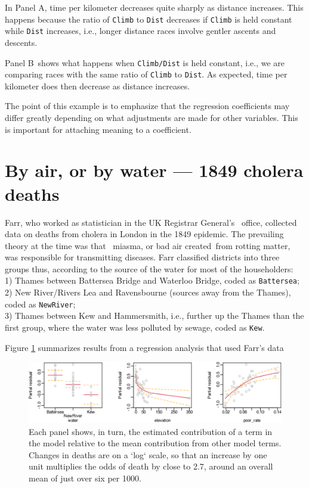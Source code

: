 \documentclass[
  10pt,
  b5paper]{book}
\begin{document}
In Panel A, time per kilometer decreases quite sharply as distance
increases. This happens because the ratio of \texttt{Climb} to \texttt{Dist}
decreases if \texttt{Climb} is held constant while \texttt{Dist} increases,
i.e., longer distance races involve gentler ascents and descents.

Panel B~shows what happens when \texttt{Climb/Dist} is held
constant, i.e., we are comparing races with the same ratio of
\texttt{Climb} to \texttt{Dist}. As expected, time per kilometer does then
decrease as distance increases.

The point of this example is to emphasize that the regression
coefficients may differ greatly depending on what adjustments
are made for other variables. This is important for attaching
meaning to a coefficient.

\hypertarget{by-air-or-by-water-1849-cholera-deaths}{%
\section{By air, or by water --- 1849 cholera deaths}\label{by-air-or-by-water-1849-cholera-deaths}}

Farr, who worked as statistician in the UK Registrar General's~
office, collected data on deaths from cholera in London in the
1849 epidemic. The prevailing theory at the time was that~
miasma, or bad air created~from rotting matter, was responsible
for transmitting diseases.
Farr classified districts into three groups thus, according
to the source of the water for most of the householders:\\
1) Thames between Battersea Bridge and Waterloo Bridge, coded
as \texttt{Battersea};\\
2) New River/Rivers Lea and Ravensbourne (sources away from
the Thames), coded as \texttt{NewRiver};\\
3) Thames between Kew and Hammersmith, i.e., further up the
Thames than the first group, where the water was less polluted
by sewage, coded as \texttt{Kew}.

Figure \ref{fig:Farr} summarizes results from a regression analysis
that used Farr's data

\begin{figure}

{\centering \includegraphics[width=1\linewidth]{08-observational_files/figure-latex/Farr-1} 

}

\caption{Each panel shows, in turn, the estimated contribution
of a term in the model relative to the mean contribution from other 
model terms. Changes in deaths are on a `log` scale, so that an 
increase by one unit multiplies the odds of death by close to 2.7, 
around an overall mean of just over six per 1000.
}\label{fig:Farr}
\end{figure}
\end{document}
